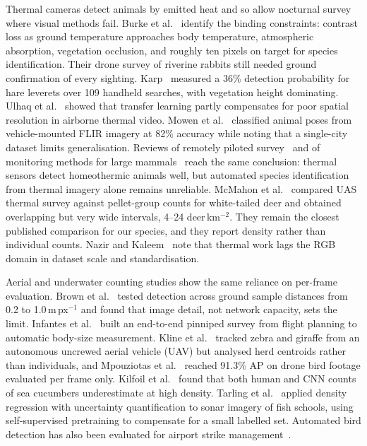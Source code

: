 Thermal cameras detect animals by emitted heat and so allow nocturnal survey where visual
methods fail. Burke et al.~\cite{burke2019optimizing} identify the binding constraints:
contrast loss as ground temperature approaches body temperature, atmospheric absorption,
vegetation occlusion, and roughly ten pixels on target for species identification. Their
drone survey of riverine rabbits still needed ground confirmation of every sighting.
Karp~\cite{karp2020detecting} measured a 36\% detection probability for hare leverets over
109 handheld searches, with vegetation height dominating. Ulhaq et
al.~\cite{ulhaq2021automated} showed that transfer learning partly compensates for poor
spatial resolution in airborne thermal video. Mowen et al.~\cite{mowen2022improving}
classified animal poses from vehicle-mounted FLIR imagery at 82\% accuracy while noting that
a single-city dataset limits generalisation. Reviews of remotely piloted
survey~\cite{hyun2020remotely} and of monitoring methods for large
mammals~\cite{prosekov2020methods} reach the same conclusion: thermal sensors detect
homeothermic animals well, but automated species identification from thermal imagery alone
remains unreliable. McMahon et al.~\cite{mcmahon2021comparing} compared UAS thermal survey
against pellet-group counts for white-tailed deer and obtained overlapping but very wide
intervals, 4--24 deer\,km$^{-2}$. They remain the closest published comparison for our
species, and they report density rather than individual counts. Nazir and
Kaleem~\cite{nazir2021advances} note that thermal work lags the RGB domain in dataset scale
and standardisation.

Aerial and underwater counting studies show the same reliance on per-frame evaluation.
Brown et al.~\cite{brown2022automated} tested detection across ground sample distances from
0.2 to 1.0\,m\,px$^{-1}$ and found that image detail, not network capacity, sets the limit.
Infantes et al.~\cite{infantes2022automated} built an end-to-end pinniped survey from flight
planning to automatic body-size measurement. Kline et al.~\cite{kline2024integrating}
tracked zebra and giraffe from an autonomous uncrewed aerial vehicle (UAV) but analysed herd
centroids rather than individuals, and Mpouziotas et al.~\cite{mpouziotas2023automated}
reached 91.3\% AP on drone bird footage evaluated per frame only. Kilfoil et
al.~\cite{kilfoil2020using} found that both human and CNN counts of sea cucumbers
underestimate at high density. Tarling et al.~\cite{tarling2022deep} applied density
regression with uncertainty quantification to sonar imagery of fish schools, using
self-supervised pretraining to compensate for a small labelled set. Automated bird detection
has also been evaluated for airport strike management~\cite{oviedo2024automatic}.

